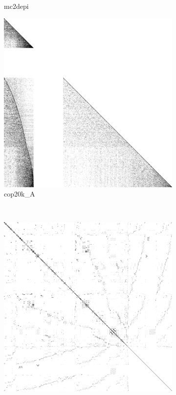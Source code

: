 \begin{figure}
\begin{multicols}{4}
\begin{subfigure}{\linewidth}
    \caption{mc2depi}
\end{subfigure}
\end{multicols}
\begin{multicols}{4}
\begin{subfigure}{\linewidth}
\includegraphics[width=\linewidth]{images/cop20k_A}
\caption{cop20k\_A}
\end{subfigure}~%
\begin{subfigure}{\linewidth}
\includegraphics[width=\linewidth]{images/scircuit}

\end{subfigure}
\end{multicols}
\end{figure}
